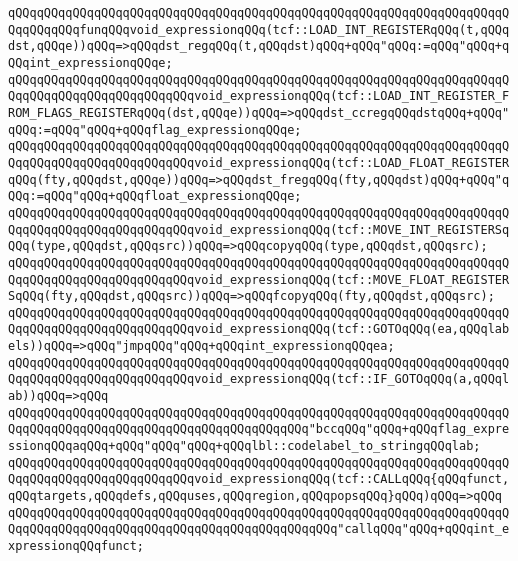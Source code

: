 \verb|qQQqqQQqqQQqqQQqqQQqqQQqqQQqqQQqqQQqqQQqqQQqqQQqqQQqqQQqqQQqqQQqqQQqqQQqqQQqqQQqfunqQQqvoid_expressionqQQq(tcf::LOAD_INT_REGISTERqQQq(t,qQQqdst,qQQqe))qQQq=>qQQqdst_regqQQq(t,qQQqdst)qQQq+qQQq"qQQq:=qQQq"qQQq+qQQqint_expressionqQQqe;|\newline
\verb|qQQqqQQqqQQqqQQqqQQqqQQqqQQqqQQqqQQqqQQqqQQqqQQqqQQqqQQqqQQqqQQqqQQqqQQqqQQqqQQqqQQqqQQqqQQqqQQqvoid_expressionqQQq(tcf::LOAD_INT_REGISTER_FROM_FLAGS_REGISTERqQQq(dst,qQQqe))qQQq=>qQQqdst_ccregqQQqdstqQQq+qQQq"qQQq:=qQQq"qQQq+qQQqflag_expressionqQQqe;|\newline
\verb|qQQqqQQqqQQqqQQqqQQqqQQqqQQqqQQqqQQqqQQqqQQqqQQqqQQqqQQqqQQqqQQqqQQqqQQqqQQqqQQqqQQqqQQqqQQqqQQqvoid_expressionqQQq(tcf::LOAD_FLOAT_REGISTERqQQq(fty,qQQqdst,qQQqe))qQQq=>qQQqdst_fregqQQq(fty,qQQqdst)qQQq+qQQq"qQQq:=qQQq"qQQq+qQQqfloat_expressionqQQqe;|\newline
\verb|qQQqqQQqqQQqqQQqqQQqqQQqqQQqqQQqqQQqqQQqqQQqqQQqqQQqqQQqqQQqqQQqqQQqqQQqqQQqqQQqqQQqqQQqqQQqqQQqvoid_expressionqQQq(tcf::MOVE_INT_REGISTERSqQQq(type,qQQqdst,qQQqsrc))qQQq=>qQQqcopyqQQq(type,qQQqdst,qQQqsrc);|\newline
\verb|qQQqqQQqqQQqqQQqqQQqqQQqqQQqqQQqqQQqqQQqqQQqqQQqqQQqqQQqqQQqqQQqqQQqqQQqqQQqqQQqqQQqqQQqqQQqqQQqvoid_expressionqQQq(tcf::MOVE_FLOAT_REGISTERSqQQq(fty,qQQqdst,qQQqsrc))qQQq=>qQQqfcopyqQQq(fty,qQQqdst,qQQqsrc);|\newline
\verb|qQQqqQQqqQQqqQQqqQQqqQQqqQQqqQQqqQQqqQQqqQQqqQQqqQQqqQQqqQQqqQQqqQQqqQQqqQQqqQQqqQQqqQQqqQQqqQQqvoid_expressionqQQq(tcf::GOTOqQQq(ea,qQQqlabels))qQQq=>qQQq"jmpqQQq"qQQq+qQQqint_expressionqQQqea;|\newline
\verb|qQQqqQQqqQQqqQQqqQQqqQQqqQQqqQQqqQQqqQQqqQQqqQQqqQQqqQQqqQQqqQQqqQQqqQQqqQQqqQQqqQQqqQQqqQQqqQQqvoid_expressionqQQq(tcf::IF_GOTOqQQq(a,qQQqlab))qQQq=>qQQq|\newline
\verb|qQQqqQQqqQQqqQQqqQQqqQQqqQQqqQQqqQQqqQQqqQQqqQQqqQQqqQQqqQQqqQQqqQQqqQQqqQQqqQQqqQQqqQQqqQQqqQQqqQQqqQQqqQQqqQQq"bccqQQq"qQQq+qQQqflag_expressionqQQqaqQQq+qQQq"qQQq"qQQq+qQQqlbl::codelabel_to_stringqQQqlab;|\newline
\verb|qQQqqQQqqQQqqQQqqQQqqQQqqQQqqQQqqQQqqQQqqQQqqQQqqQQqqQQqqQQqqQQqqQQqqQQqqQQqqQQqqQQqqQQqqQQqqQQqvoid_expressionqQQq(tcf::CALLqQQq{qQQqfunct,qQQqtargets,qQQqdefs,qQQquses,qQQqregion,qQQqpopsqQQq}qQQq)qQQq=>qQQq|\newline
\verb|qQQqqQQqqQQqqQQqqQQqqQQqqQQqqQQqqQQqqQQqqQQqqQQqqQQqqQQqqQQqqQQqqQQqqQQqqQQqqQQqqQQqqQQqqQQqqQQqqQQqqQQqqQQqqQQqqQQq"callqQQq"qQQq+qQQqint_expressionqQQqfunct;|\newline

